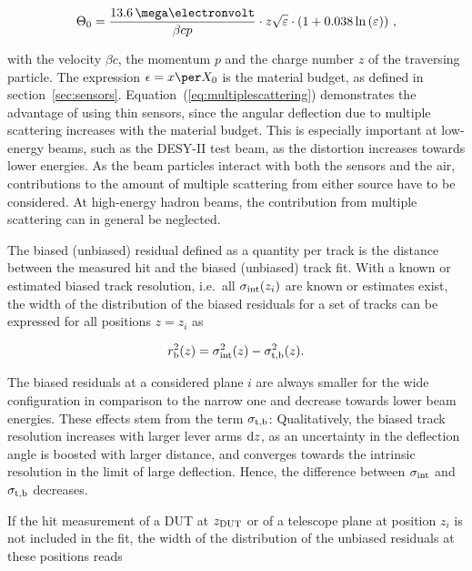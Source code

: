 \begin{equation}
\label{eq:multiplescattering}
\Theta_{0} = \frac{13.6\,\mega\electronvolt}{\beta c p} \cdot z
\sqrt{\varepsilon}
\cdot \left( 1 + 0.038 \ln{\left( \varepsilon \right) } \right) \,,
\end{equation}

\noindent with the velocity $\beta c$, the momentum $p$ and the charge number $z$ of the traversing particle. 
The expression $\epsilon = x \per X_0$ is the material budget, as defined in section~\ref{sec:sensors}.
%
Equation~(\ref{eq:multiplescattering}) demonstrates the advantage of using thin sensors, since the angular deflection due to multiple scattering increases with the material budget.
This is especially important at low-energy beams, such as the DESY-II test beam, as the distortion increases towards lower energies.
As the beam particles interact with both the sensors and the air, contributions to the amount of multiple scattering from either source have to be considered.
At high-energy hadron beams, the contribution from multiple scattering can in general be neglected. 
 
The biased (unbiased) residual defined as a quantity per track is the distance between the measured hit and the biased (unbiased) track fit. 
With a known or estimated biased track resolution, i.e.\ all $\sigma_{\textrm{int}}(z_i)$ are known or estimates exist,
 the width of the distribution of the biased residuals for a set of tracks can be expressed for all positions $z = z_i$ as

\begin{equation}
 \label{eq:telescoperesolutionequation1}
 r_{\textrm{b}}^2(z) = \sigma_{\textrm{int}}^2(z) - \sigma_{\textrm{t,b}}^2(z).
\end{equation}

\noindent
The biased residuals at a considered plane $i$ are always smaller for the wide configuration in comparison to the narrow one and decrease towards lower beam energies. 
These effects stem from the term $\sigma_{\textrm{t,b}}$: 
Qualitatively, the biased track resolution increases with larger lever arms $\textrm{d}z$, as an uncertainty in the deflection angle is boosted with larger distance,
 and converges towards the intrinsic resolution in the limit of large deflection. 
Hence, the difference between $\sigma_{\textrm{int}}$ and $\sigma_{\textrm{t,b}}$ decreases. 

If the hit measurement of a DUT at $z_{\textrm{DUT}}$ or of a telescope plane at position $z_i$ is not included in the fit,
 the width of the distribution of the unbiased residuals at these positions reads~\cite{ref:eudetreport200902}
 
